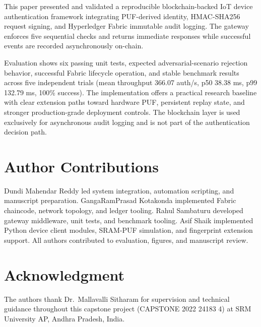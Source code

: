 \documentclass[conference]{IEEEtran}
\begin{document}
This paper presented and validated a reproducible blockchain-backed IoT device
authentication framework integrating PUF-derived identity, HMAC-SHA256 request
signing, and Hyperledger Fabric immutable audit logging. The gateway enforces
five sequential checks and returns immediate responses while successful events
are recorded asynchronously on-chain.

Evaluation shows six passing unit tests, expected adversarial-scenario
rejection behavior, successful Fabric lifecycle operation, and stable benchmark
results across five independent trials (mean throughput 366.07 auth/s, p50
38.38 ms, p99 132.79 ms, 100\% success). The implementation offers a practical
research baseline with clear extension paths toward hardware PUF, persistent
replay state, and stronger production-grade deployment controls.
The blockchain layer is used exclusively for asynchronous audit logging and is not part of the authentication decision path.

\section*{Author Contributions}

Dundi Mahendar Reddy led system integration, automation scripting, and
manuscript preparation. GangaRamPrasad Kotakonda implemented Fabric chaincode,
network topology, and ledger tooling. Rahul Sambaturu developed gateway
middleware, unit tests, and benchmark tooling. Asif Shaik implemented Python
device client modules, SRAM-PUF simulation, and fingerprint extension support.
All authors contributed to evaluation, figures, and manuscript review.

\section*{Acknowledgment}

The authors thank Dr.\ Mallavalli Sitharam for supervision and technical
guidance throughout this capstone project (CAPSTONE 2022 24183 4) at
SRM University AP, Andhra Pradesh, India.
\end{document}
